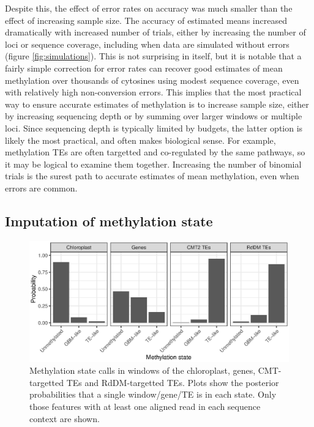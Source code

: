 \documentclass[12pt,longbibliography]{article}
\begin{document}
Despite this, the effect of error rates on accuracy was much smaller than the effect of increasing sample size.
The accuracy of estimated means increased dramatically with increased number of trials, either by increasing the number of loci or sequence coverage, including when data are simulated without errors (figure \ref{fig:simulations}).
This is not surprising in itself, but it is notable that a fairly simple correction for error rates can recover good estimates of mean methylation over thousands of cytosines using modest sequence coverage, even with relatively high non-conversion errors.
This implies that the most practical way to ensure accurate estimates of methylation is to increase sample size, either by increasing sequencing depth or by summing over larger windows or multiple loci.
Since sequencing depth is typically limited by budgets, the latter option is likely the most practical, and often makes biological sense.
For example, methylation TEs are often targetted and co-regulated by the same pathways, so it may be logical to examine them together.
Increasing the number of binomial trials is the surest path to accurate estimates of mean methylation, even when errors are common.

\subsection{Imputation of methylation state}

\begin{figure}
    \centering
    \includegraphics{figure4.eps}
    \caption{
        Methylation state calls in windows of the chloroplast, genes, CMT-targetted TEs and RdDM-targetted TEs.
        Plots show the posterior probabilities that a single window/gene/TE is in each state.
        Only those features with at least one aligned read in each sequence context are shown.
    }
    \label{fig:meth-state}
\end{figure}
\end{document}
